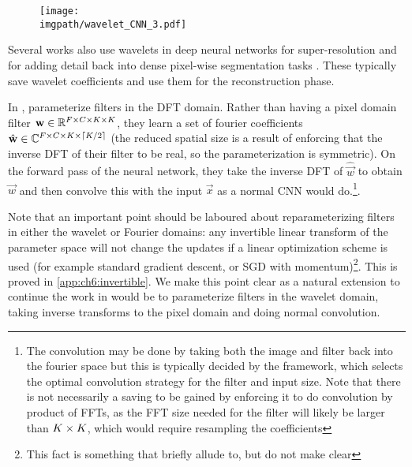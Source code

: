 \begin{figure}[bt]
  \centering
  \texttt{[image: \\imgpath/wavelet\_CNN\_3.pdf]}
  \label{fig:ch6:fujieda}
\end{figure}

Several works also use wavelets in deep neural networks for super-resolution
\cite{guo_deep_2017} and for adding detail back into dense pixel-wise
segmentation tasks \cite{ma_detailed_2018}. These typically save wavelet
coefficients and use them for the reconstruction phase.

In \cite{rippel_spectral_2015}, \citeauthor{rippel_spectral_2015}
parameterize filters in the DFT domain. Rather than having a pixel domain filter
$\vec{w} \in \reals[F\x C\x K\x K]$, they learn a set of fourier coefficients
$\hat{\vec{w}} \in \complexes[F\x C\x K \x \ceil{K/2}]$
(the reduced spatial size is a result of enforcing that the inverse DFT of their
filter to be real, so the parameterization is symmetric). On the forward pass of
the neural network, they take the inverse DFT of $\hat{\vec{w}}$ to obtain
$\vec{w}$ and then convolve this with the input $\vec{x}$ as a normal CNN
would do.\footnote{The convolution may be done by taking both the image and
filter back into the fourier space but this is typically decided by the
framework, which selects the optimal convolution strategy for the filter and
input size. Note that there is not necessarily a saving to be gained by
enforcing it to do convolution by product of FFTs, as the FFT size needed for
the filter will likely be larger than $K\x K$, which would require resampling
the coefficients}. 

Note that an important point should be laboured about reparameterizing filters
in either the wavelet or Fourier domains: any invertible linear
transform of the parameter space will not change the updates if a linear
optimization scheme is used (for example standard gradient descent, or SGD with momentum)\footnote{This fact 
is something that \citeauthor{rippel_spectral_2015} briefly allude to, but do not make clear}.
This is proved in \autoref{app:ch6:invertible}.  
We make this point clear as a natural extension to continue the work
in \cite{rippel_spectral_2015} would be to parameterize filters in the wavelet domain,
taking inverse transforms to the pixel domain and doing normal convolution. 

